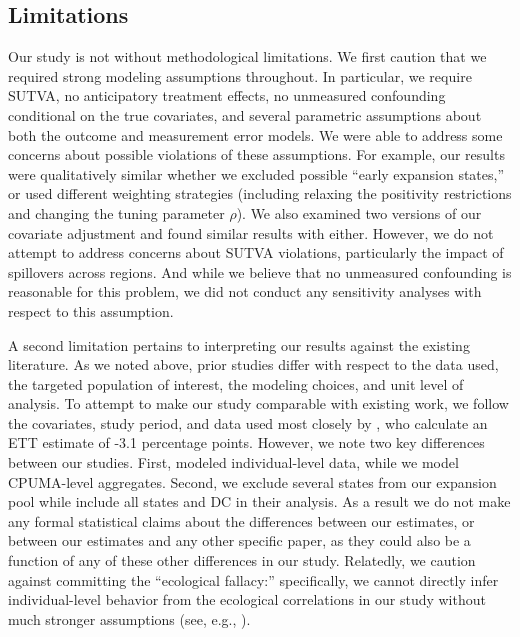 \subsection{Limitations}

Our study is not without methodological limitations. We first caution that we required strong modeling assumptions throughout. In particular, we require SUTVA, no anticipatory treatment effects, no unmeasured confounding conditional on the true covariates, and several parametric assumptions about both the outcome and measurement error models. We were able to address some concerns about possible violations of these assumptions. For example, our results were qualitatively similar whether we excluded possible ``early expansion states,'' or used different weighting strategies (including relaxing the positivity restrictions and changing the tuning parameter $\rho$). We also examined two versions of our covariate adjustment and found similar results with either.  However, we do not attempt to address concerns about SUTVA violations, particularly the impact of spillovers across regions. And while we believe that no unmeasured confounding is reasonable for this problem, we did not conduct any sensitivity analyses with respect to this assumption.

A second limitation pertains to interpreting our results against the existing literature. As we noted above, prior studies differ with respect to the data used, the targeted population of interest, the modeling choices, and unit level of analysis. To attempt to make our study comparable with existing work, we follow the covariates, study period, and data used most closely by \cite{courtemanche2017early}, who calculate an ETT estimate of -3.1 percentage points. However, we note two key differences between our studies. First, \cite{courtemanche2017early} modeled individual-level data, while we model CPUMA-level aggregates. Second, we exclude several states from our expansion pool while \cite{courtemanche2017early} include all states and DC in their analysis. As a result we do not make any formal statistical claims about the differences between our estimates, or between our estimates and any other specific paper, as they could also be a function of any of these other differences in our study. Relatedly, we caution against committing the ``ecological fallacy:'' specifically, we cannot directly infer individual-level behavior from the ecological correlations in our study without much stronger assumptions (see, e.g., \cite{subramanian2009revisiting}).

